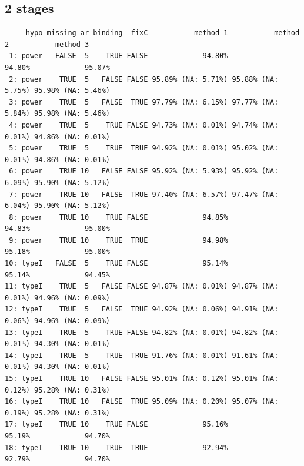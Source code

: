 \documentclass[12pt]{article}
\begin{document}
\subsection{2 stages}
\label{sec:org22e202a}
\begin{verbatim}
     hypo missing ar binding  fixC           method 1           method 2           method 3
 1: power   FALSE  5    TRUE FALSE             94.80%             94.80%             95.07%
 2: power    TRUE  5   FALSE FALSE 95.89% (NA: 5.71%) 95.88% (NA: 5.75%) 95.98% (NA: 5.46%)
 3: power    TRUE  5   FALSE  TRUE 97.79% (NA: 6.15%) 97.77% (NA: 5.84%) 95.98% (NA: 5.46%)
 4: power    TRUE  5    TRUE FALSE 94.73% (NA: 0.01%) 94.74% (NA: 0.01%) 94.86% (NA: 0.01%)
 5: power    TRUE  5    TRUE  TRUE 94.92% (NA: 0.01%) 95.02% (NA: 0.01%) 94.86% (NA: 0.01%)
 6: power    TRUE 10   FALSE FALSE 95.92% (NA: 5.93%) 95.92% (NA: 6.09%) 95.90% (NA: 5.12%)
 7: power    TRUE 10   FALSE  TRUE 97.40% (NA: 6.57%) 97.47% (NA: 6.04%) 95.90% (NA: 5.12%)
 8: power    TRUE 10    TRUE FALSE             94.85%             94.83%             95.00%
 9: power    TRUE 10    TRUE  TRUE             94.98%             95.18%             95.00%
10: typeI   FALSE  5    TRUE FALSE             95.14%             95.14%             94.45%
11: typeI    TRUE  5   FALSE FALSE 94.87% (NA: 0.01%) 94.87% (NA: 0.01%) 94.96% (NA: 0.09%)
12: typeI    TRUE  5   FALSE  TRUE 94.92% (NA: 0.06%) 94.91% (NA: 0.06%) 94.96% (NA: 0.09%)
13: typeI    TRUE  5    TRUE FALSE 94.82% (NA: 0.01%) 94.82% (NA: 0.01%) 94.30% (NA: 0.01%)
14: typeI    TRUE  5    TRUE  TRUE 91.76% (NA: 0.01%) 91.61% (NA: 0.01%) 94.30% (NA: 0.01%)
15: typeI    TRUE 10   FALSE FALSE 95.01% (NA: 0.12%) 95.01% (NA: 0.12%) 95.28% (NA: 0.31%)
16: typeI    TRUE 10   FALSE  TRUE 95.09% (NA: 0.20%) 95.07% (NA: 0.19%) 95.28% (NA: 0.31%)
17: typeI    TRUE 10    TRUE FALSE             95.16%             95.19%             94.70%
18: typeI    TRUE 10    TRUE  TRUE             92.94%             92.79%             94.70%
\end{verbatim}
\end{document}

